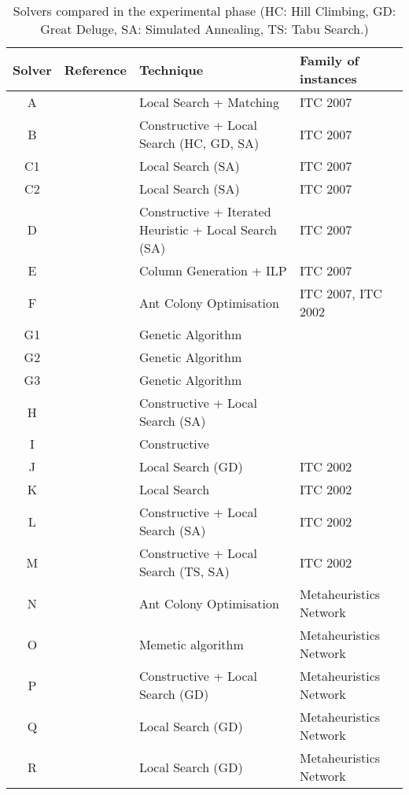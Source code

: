 \documentclass[authoryear,preprint,a4paper,12pt]{elsarticle}
\begin{document}
\begin{sidewaystable}
\footnotesize
\begin{tabular}{|c|l|l|l|}\hline
Solver & Reference & Technique & Family of instances \\ \hline
A & \citet{ChFH08} & Local Search + Matching  & ITC 2007 \\
B & \citet{Mull09} &Constructive + Local Search (HC, GD, SA) & ITC 2007\\
C1 & \citet{CHOP10}& Local Search (SA) & ITC 2007 \\
C2 & \citet{CHOP10}& Local Search (SA) & ITC 2007 \\
D & \citet{Lewi10} & Constructive + Iterated Heuristic + Local Search (SA) & ITC 2007 \\
E & \citet{BrHu10} & Column Generation + ILP & ITC 2007 \\
F & \citet{MNCR08}& Ant Colony Optimisation & ITC 2007, ITC 2002 \\
G1 & \citet{LePa07}& Genetic Algorithm & \citeauthor{LePa07} \\
G2 & \citet{LePa07}& Genetic Algorithm & \citeauthor{LePa07} \\
G3 & \citet{LePa07} & Genetic Algorithm & \citeauthor{LePa07} \\
H & \citet{TuBM07} & Constructive + Local Search (SA) & \citeauthor{LePa07} \\
I & \citet{LiZC11} &  Constructive & \citeauthor{LePa07} \\
J & \citet{BBNP03} & Local Search (GD) & ITC 2002 \\
K & \citet{DiSc06} & Local Search & ITC 2002 \\
L & \citet{Kost04} & Constructive + Local Search (SA) & ITC 2002 \\
M & \citet{CBSR06} & Constructive + Local Search (TS, SA) & ITC 2002 \\
N & \citet{SoKS02} & Ant Colony Optimisation & Metaheuristics Network \\
O & \citet{AbBM07b} & Memetic algorithm & Metaheuristics Network\\
P & \citet{McMu07} & Constructive + Local Search (GD) & Metaheuristics Network \\
Q & \citet{LaOb08} & Local Search (GD) & Metaheuristics Network \\
R & \citet{TuSM09} & Local Search (GD) & Metaheuristics Network \\ 
\hline
\end{tabular}
\caption{Solvers compared in the experimental phase (HC: Hill Climbing, GD: Great Deluge, SA: Simulated Annealing, TS: Tabu Search.)}
\label{tab:solvers}
\end{sidewaystable}
\end{document}
